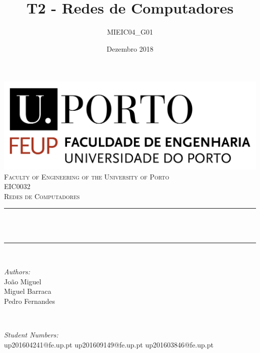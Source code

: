 \documentclass{article}
\title{T2 - Redes de Computadores}
\author{MIEIC04\_G01}
\date{Dezembro 2018}
\begin{document}
\begin{titlepage}
	\centering
    \vspace*{0.5 cm}
    \includegraphics[scale = 0.75]{feup_logo.png}\\[1.0 cm]	%
    \textsc{\LARGE Faculty of Engineering of the University of Porto}\\[2.0 cm]	%
	\textsc{\Large EIC0032}\\[0.5 cm]				%
	\textsc{\large Redes de Computadores}\\[0.5 cm]				%
	\rule{\linewidth}{0.2 mm} \\[0.4 cm]
	{ \huge \bfseries \thetitle}\\ 
	\rule{\linewidth}{0.2 mm} \\[1.5 cm]
	
	\begin{minipage}{0.4\textwidth}
		\begin{flushleft} \large
			\emph{Authors:}\\
            João Miguel\\
            Miguel Barraca\\
            Pedro Fernandes
        \end{flushleft}
    \end{minipage}~
    \begin{minipage}{0.4\textwidth}
        \begin{flushright} \large
            \emph{Student Numbers:} \\
            up201604241@fe.up.pt
            up201609149@fe.up.pt
            up201603846@fe.up.pt
		\end{flushright}
\end{minipage}\\[2 cm]
	
{\large \thedate}\\[2 cm]
 
\vfill
	
\end{titlepage}
\end{document}

